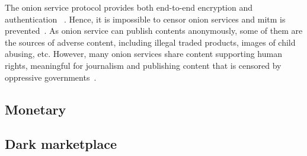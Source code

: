 The onion service protocol provides both end-to-end encryption and authentication
~\cite{web:onion_service}. Hence, it is impossible to censor onion services
and \gls{mitm} is prevented~\cite{dis:usage_of_onion_services}. As onion service
can publish contents anonymously, some of them are the sources of adverse content,
including illegal traded products, images of child abusing, etc. However, many onion services
share content supporting human rights, meaningful for journalism and publishing
content that is censored by oppressive governments~\cite{dis:usage_of_onion_services}. 

\subsection{Monetary}

\subsection{Dark marketplace}